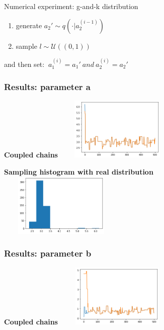 \documentclass{beamer}
\begin{document}
\begin{section}{Numerical experiment: g-and-k distribution}
\begin{frame}
	\begin{enumerate}
		\item generate $ a_{2}' \sim q( \cdot |a_{2}^{(i-1)} ) $
		
		\item sample $ l \sim \mathcal{U}((0,1)) $
	\end{enumerate}
	and then set:   $ \ a_{1}^{(i)}=a_{1}' \ and \ a_{2}^{(i)}= a_{2}'$
	
	
\end{frame}


\begin{frame}
	\frametitle{Results: parameter a}
	\begin{center}
		\begin{minipage}{0.63\textwidth}
			\begin{center}
				{\scriptsize \textbf{Coupled chains}}
				\includegraphics[width=6cm,height=3cm]{immagini_mario/a_chains}
			\end{center}
		\end{minipage}
		
		\vspace{0.2cm}
		
		\begin{minipage}{0.63\textwidth}
			\begin{center}
				{\scriptsize \textbf{Sampling histogram with real distribution}}
				\includegraphics[width=6cm,height=3cm]{immagini_mario/a_hist}
			\end{center}
		\end{minipage}
	\end{center}
\end{frame}

\begin{frame}
	\frametitle{Results: parameter b}
	\begin{center}
		\begin{minipage}{0.63\textwidth}
			\begin{center}
				{\scriptsize \textbf{Coupled chains}}
				\includegraphics[width=6cm,height=3cm]{immagini_mario/b_chains}
			\end{center}
		\end{minipage}
		

\end{center}
\end{frame}
\end{section}
\end{document}

